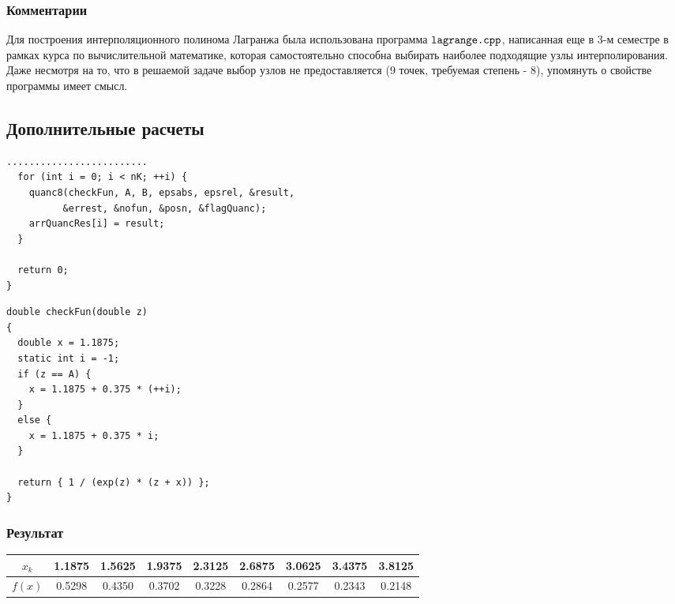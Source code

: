 \documentclass[a4paper,11pt]{article}
\begin{document}
\subsubsection{Комментарии}
\noindent Для построения интерполяционного полинома Лагранжа была использована программа $\verb|lagrange.cpp|$,
      написанная еще в 3-м семестре в рамках курса по вычислительной математике, которая
      самостоятельно способна       выбирать наиболее подходящие узлы интерполирования.
      Даже несмотря на то, что в решаемой задаче выбор узлов не предоставляется (9 точек, требуемая степень - 8),
      упомянуть о свойстве программы имеет смысл.

\vspace{5mm}
\subsection{Дополнительные расчеты}
\begin{lstlisting}[label=quanc8 extra,caption=QUANC8 по точкам $x_k$]
  .........................
  for (int i = 0; i < nK; ++i) {
    quanc8(checkFun, A, B, epsabs, epsrel, &result,
          &errest, &nofun, &posn, &flagQuanc);
    arrQuancRes[i] = result;
  }

  return 0;
}
\end{lstlisting}

\begin{lstlisting}[label=fun extra,caption=Функция с расчетом $x_k$]
double checkFun(double z)
{
  double x = 1.1875;
  static int i = -1;
  if (z == A) {
    x = 1.1875 + 0.375 * (++i);
  }
  else {
    x = 1.1875 + 0.375 * i;
  }

  return { 1 / (exp(z) * (z + x)) };
}
\end{lstlisting}

\subsubsection{Результат}
\begin{tabular}{ | c | c | c | c | c | c | c | c | c | }
  \hline
  \footnotesize
  $x_k$ & 1.1875 & 1.5625 & 1.9375 & 2.3125 & 2.6875 & 3.0625 & 3.4375 & 3.8125 \\ \hline
  $f(x)$ & 0.5298 & 0.4350 & 0.3702 & 0.3228 & 0.2864 & 0.2577 & 0.2343 & 0.2148 \\ \hline
\end{tabular} \\
\end{document}
